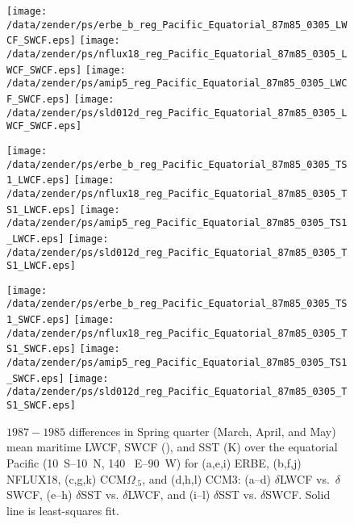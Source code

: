 \documentclass[twocolumn,final,11pt]{article}
\begin{document}
\begin{sidewaysfigure*}
\begin{center}
\texttt{[image: /data/zender/ps/erbe\_b\_reg\_Pacific\_Equatorial\_87m85\_0305\_LWCF\_SWCF.eps]}%
\texttt{[image: /data/zender/ps/nflux18\_reg\_Pacific\_Equatorial\_87m85\_0305\_LWCF\_SWCF.eps]}%
\texttt{[image: /data/zender/ps/amip5\_reg\_Pacific\_Equatorial\_87m85\_0305\_LWCF\_SWCF.eps]}%
\texttt{[image: /data/zender/ps/sld012d\_reg\_Pacific\_Equatorial\_87m85\_0305\_LWCF\_SWCF.eps]}%

\texttt{[image: /data/zender/ps/erbe\_b\_reg\_Pacific\_Equatorial\_87m85\_0305\_TS1\_LWCF.eps]}%
\texttt{[image: /data/zender/ps/nflux18\_reg\_Pacific\_Equatorial\_87m85\_0305\_TS1\_LWCF.eps]}%
\texttt{[image: /data/zender/ps/amip5\_reg\_Pacific\_Equatorial\_87m85\_0305\_TS1\_LWCF.eps]}%
\texttt{[image: /data/zender/ps/sld012d\_reg\_Pacific\_Equatorial\_87m85\_0305\_TS1\_LWCF.eps]}%

\texttt{[image: /data/zender/ps/erbe\_b\_reg\_Pacific\_Equatorial\_87m85\_0305\_TS1\_SWCF.eps]}%
\texttt{[image: /data/zender/ps/nflux18\_reg\_Pacific\_Equatorial\_87m85\_0305\_TS1\_SWCF.eps]}%
\texttt{[image: /data/zender/ps/amip5\_reg\_Pacific\_Equatorial\_87m85\_0305\_TS1\_SWCF.eps]}%
\texttt{[image: /data/zender/ps/sld012d\_reg\_Pacific\_Equatorial\_87m85\_0305\_TS1\_SWCF.eps]}%
\end{center}
\caption[$1987-1985$ differences in Spring quarter (March, April, and
May) mean maritime LWCF, SWCF, and SST over the equatorial Pacific for
ERBE, NFLUX18, CCM$\Omega_{.5}$, and CCM3]{ 
$1987-1985$ differences in Spring quarter (March, April, and May) 
mean maritime LWCF, SWCF (\wxmS), and SST (\degreee K) over the
equatorial Pacific (10~\degreee S--10~\degreee N, 140~\degreee
E--90~\degreee W) for (a,e,i) ERBE, (b,f,j) NFLUX18, (c,g,k)
CCM$\Omega_{.5}$, and (d,h,l) CCM3: (a--d) $\delta$LWCF vs.\
$\delta$SWCF, (e--h) $\delta$SST vs. $\delta$LWCF, and (i--l)
$\delta$SST vs. $\delta$SWCF.
Solid line is least-squares fit.
\label{fig:reg_Pacific_Equatorial_87m85_0305_LWCF_SWCF}}   
\end{sidewaysfigure*}
\clearpage
\end{document}
